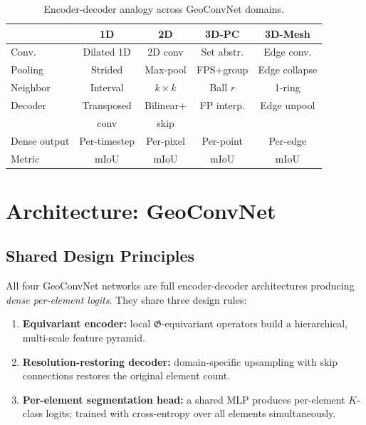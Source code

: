 \documentclass[10pt,conference]{IEEEtran}
\newcommand{\fG}{\mathfrak{G}}
\begin{document}
\begin{table}[t]
  \renewcommand{\arraystretch}{1.2}
  \caption{Encoder-decoder analogy across GeoConvNet domains.}
  \label{tab:analogy}
  \centering
  \begin{tabular}{lcccc}
    \toprule
    & \textbf{1D} & \textbf{2D} & \textbf{3D-PC} & \textbf{3D-Mesh} \\
    \midrule
    Conv.        & Dilated 1D  & 2D conv     & Set abstr.   & Edge conv.    \\
    Pooling      & Strided     & Max-pool    & FPS+group    & Edge collapse \\
    Neighbor     & Interval    & $k{\times}k$ & Ball $r$   & 1-ring        \\
    Decoder      & Transposed  & Bilinear+   & FP interp.   & Edge unpool   \\
                 & conv        & skip        &              &               \\
    Dense output & Per-timestep & Per-pixel  & Per-point    & Per-edge      \\
    Metric       & mIoU        & mIoU        & mIoU         & mIoU          \\
    \bottomrule
  \end{tabular}
\end{table}

\section{Architecture: GeoConvNet}
\label{sec:architecture}

\subsection{Shared Design Principles}

All four GeoConvNet networks are full encoder-decoder architectures
producing \emph{dense per-element logits}.  They share three design rules:
\begin{enumerate}
  \item \textbf{Equivariant encoder:} local $\fG$-equivariant operators
    build a hierarchical, multi-scale feature pyramid.
  \item \textbf{Resolution-restoring decoder:} domain-specific upsampling
    with skip connections restores the original element count.
  \item \textbf{Per-element segmentation head:} a shared MLP produces
    per-element $K$-class logits; trained with cross-entropy over all
    elements simultaneously.
\end{enumerate}
\end{document}
